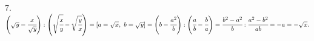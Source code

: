 7. $\left(\sqrt{y}-\cfrac{x}{\sqrt{y}}\right):\left(\sqrt{\cfrac{x}{y}}-\sqrt{\cfrac{y}{x}}\right)=[a=\sqrt{x},\ b=\sqrt{y}]=
\left(b-\cfrac{a^2}{b}\right):\left(\cfrac{a}{b}-\cfrac{b}{a}\right)=\cfrac{b^2-a^2}{b}:\cfrac{a^2-b^2}{ab}=-a=-\sqrt{x}.$\\
